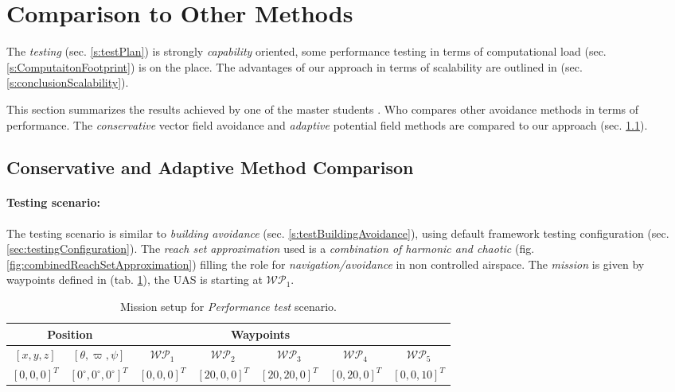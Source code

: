 \section{Comparison to Other Methods}\label{s:OtherMethodsComparison}
\noindent The \emph{testing} (sec. \ref{s:testPlan}) is strongly \emph{capability} oriented, some performance testing in terms of computational load (sec. \ref{s:ComputaitonFootprint}) is on the place. The advantages of our approach in terms of scalability are outlined in (sec. \ref{s:conclusionScalability}).

This section summarizes the results achieved by one of the master students \cite{hrdlik2018}. Who compares other avoidance methods in terms of performance. The  \emph{conservative }vector field avoidance \cite{borenstein1991vector} and \emph{adaptive} potential field \cite{koren1991potential} methods are compared to our approach (sec. \ref{s:conservativeComparison}).

\subsection{Conservative and Adaptive Method Comparison}\label{s:conservativeComparison}
\paragraph{Testing scenario:} The testing scenario is similar to \emph{building avoidance} (sec. \ref{s:testBuildingAvoidance}), using default framework testing configuration (sec. \ref{sec:testingConfiguration}). The \emph{reach set approximation} used is a \emph{combination of harmonic and chaotic} (fig. \ref{fig:combinedReachSetApproximation}) filling the role for \emph{navigation/avoidance} in non controlled airspace. The \emph{mission} is given by waypoints defined in (tab. \ref{tab:missionSetupForPErformanceTest}), the UAS is starting at $\mathscr{WP}_1$.

\begin{table}[H]
	\centering
	\begin{tabular}{c|c||c|c|c|c|c}
		\multicolumn{2}{c||}{Position} & \multicolumn{4}{c}{Waypoints} \\\hline
		$[x,y,z]$     & $[\theta,\varpi,\psi]$           & $\mathscr{WP}_1$   & $\mathscr{WP}_2$   & $\mathscr{WP}_3$   & $\mathscr{WP}_4$    & $\mathscr{WP}_5$\\\hline\hline
		$[0,0,0]^T $       & $[0^\circ,0^\circ,0^\circ]^T$ & $[0,0,0]^T$ & $[20,0,0]^T$       & $[20,20,0]^T$       & $[0,20,0]^T$       & $[0,0,10]^T$       
	\end{tabular}
	\caption{Mission setup for \emph{Performance test} scenario.}
	\label{tab:missionSetupForPErformanceTest}
\end{table}

